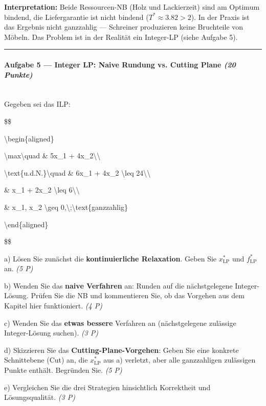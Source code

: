 \documentclass[11pt, a4paper]{article}
\begin{document}
\textbf{Interpretation:} Beide Ressourcen-NB (Holz und Lackierzeit) sind am Optimum bindend, die Liefergarantie ist nicht bindend ($T^*\approx 3.82 > 2$). In der Praxis ist das Ergebnis nicht ganzzahlig — Schreiner produzieren keine Bruchteile von Möbeln. Das Problem ist in der Realität ein Integer-LP (siehe Aufgabe 5).



\noindent\textcolor{rulegray}{\rule{\linewidth}{0.4pt}}


\paragraph{Aufgabe 5 — Integer LP: Naive Rundung vs. Cutting Plane \textit{(20 Punkte)}}\mbox{}\\[2pt]

Gegeben sei das ILP:

\$\$

\textbackslash{}begin\{aligned\}

\textbackslash{}max\textbackslash{}quad \& 5x\_1 + 4x\_2\textbackslash{}\textbackslash{}

\textbackslash{}text\{u.d.N.\}\textbackslash{}quad \& 6x\_1 + 4x\_2 \textbackslash{}leq 24\textbackslash{}\textbackslash{}

\& x\_1 + 2x\_2 \textbackslash{}leq 6\textbackslash{}\textbackslash{}

\& x\_1, x\_2 \textbackslash{}geq 0,\textbackslash{};\textbackslash{}text\{ganzzahlig\}

\textbackslash{}end\{aligned\}

\$\$


a) Lösen Sie zunächst die \textbf{kontinuierliche Relaxation}. Geben Sie $x^*_{\text{LP}}$ und $f^*_{\text{LP}}$ an. \textit{(5 P)}


b) Wenden Sie das \textbf{naive Verfahren} an: Runden auf die nächstgelegene Integer-Lösung. Prüfen Sie die NB und kommentieren Sie, ob das Vorgehen aus dem Kapitel hier funktioniert. \textit{(4 P)}


c) Wenden Sie das \textbf{etwas bessere} Verfahren an (nächstgelegene zulässige Integer-Lösung suchen). \textit{(3 P)}


d) Skizzieren Sie das \textbf{Cutting-Plane-Vorgehen}: Geben Sie eine konkrete Schnittebene (Cut) an, die $x^*_{\text{LP}}$ aus a) verletzt, aber alle ganzzahligen zulässigen Punkte enthält. Begründen Sie. \textit{(5 P)}


e) Vergleichen Sie die drei Strategien hinsichtlich Korrektheit und Lösungsqualität. \textit{(3 P)}
\end{document}
